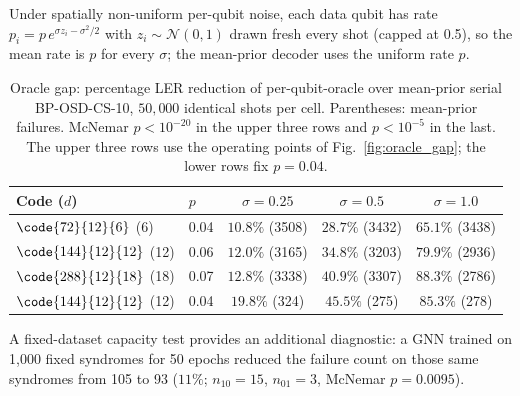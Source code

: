 \begin{table}[t]
\centering
\caption{GNN+OSD vs.\ serial BP-OSD on $\code{72}{12}{6}$, $\eta=20$,
         $20{,}000$ identical shots per $p$, five GNN training seeds.
         Serial min-sum BP-OSD-CS-10 (scaling 0.8, 100 iterations).}
\label{tab:gnn_null}
\end{table}

Under spatially non-uniform per-qubit noise, each data qubit has rate
$p_i=p\,e^{\sigma z_i-\sigma^2/2}$ with $z_i\sim\mathcal N(0,1)$ drawn
fresh every shot (capped at 0.5), so the mean rate is $p$ for every
$\sigma$; the mean-prior decoder uses the uniform rate $p$.

\begin{table}[t]
\centering
\caption{Oracle gap: percentage LER reduction of per-qubit-oracle over
         mean-prior serial BP-OSD-CS-10, $50{,}000$ identical shots per
         cell. Parentheses: mean-prior failures. McNemar
         $p<10^{-20}$ in the upper three rows and $p<10^{-5}$ in the last.
         The upper three rows use the operating points of
         Fig.~\ref{fig:oracle_gap}; the lower rows fix $p=0.04$.}
\label{tab:oracle}
\begin{tabular}{@{}llccc@{}}
\toprule
Code ($d$) & $p$ & $\sigma=0.25$ & $\sigma=0.5$ & $\sigma=1.0$ \\
\midrule
$\code{72}{12}{6}$   (6)  & 0.04 & $10.8\%$ (3508) & $28.7\%$ (3432) & $65.1\%$ (3438) \\
$\code{144}{12}{12}$ (12) & 0.06 & $12.0\%$ (3165) & $34.8\%$ (3203) & $79.9\%$ (2936) \\
$\code{288}{12}{18}$ (18) & 0.07 & $12.8\%$ (3338) & $40.9\%$ (3307) & $88.3\%$ (2786) \\
\midrule
$\code{144}{12}{12}$ (12) & 0.04 & $19.8\%$ (324)  & $45.5\%$ (275)  & $85.3\%$ (278) \\
\bottomrule
\end{tabular}
\end{table}

A fixed-dataset capacity test provides an additional diagnostic: a GNN
trained on 1{,}000 fixed syndromes for 50 epochs reduced the failure count
on those same syndromes from 105 to 93 ($11\%$; $n_{10}=15$, $n_{01}=3$,
McNemar $p=0.0095$).
